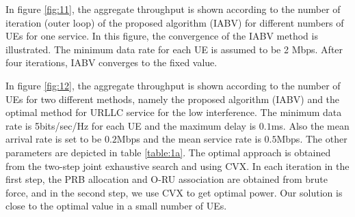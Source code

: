 \documentclass[lettersize,journal]{IEEEtran}
\begin{document}
In figure \ref{fig:11}, the aggregate throughput is shown according to the number of iteration (outer loop) of the
proposed algorithm (IABV) for different numbers of UEs for one service. In this figure, the convergence of the IABV method is illustrated. The minimum data rate for each UE is assumed to be 2 Mbps.
After four iterations, IABV converges to the fixed value.


In figure \ref{fig:12}, the aggregate throughput is shown according to the number of UEs for two different methods, namely the
proposed algorithm (IABV) and the optimal method for URLLC service for the low interference.
The minimum data rate is 5bits/sec/Hz for each UE and the maximum delay is $0.1$ms.
Also the mean arrival rate is set to be $0.2$Mbps and the mean service rate is $0.5$Mbps.
The other parameters are depicted in table \ref{table:1a}.
The optimal approach is obtained from the two-step joint exhaustive search and using CVX. 
In each iteration in the first step, the PRB allocation and O-RU association are obtained from brute force, and in the second step, we use CVX to get optimal power.
Our solution is close to the optimal value in a small number of UEs.
\end{document}
